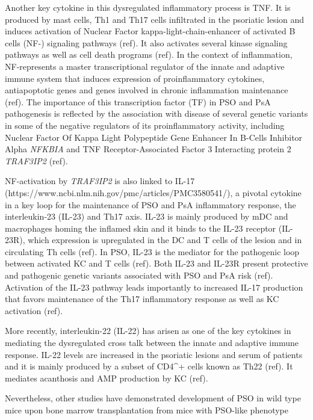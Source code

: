 Another key cytokine in this dysregulated inflammatory process is TNF\alpha. It is produced by mast cells, Th1 and Th17 cells infiltrated in the psoriatic lesion and induces activation of Nuclear Factor kappa-light-chain-enhancer of activated B cells (NF-\kapaB) signaling pathways (ref). It also activates several kinase signaling pathways as well as cell death programs (ref). In the context of inflammation, NF-\kappaB represents a master transcriptional regulator of the innate and adaptive immune system that induces expression of proinflammatory cytokines, antiapoptotic genes and genes involved in chronic inflammation maintenance (ref). The importance of this transcription factor (TF) in PSO and PsA pathogenesis is reflected by the association with disease of several genetic variants in some of the negative regulators of its proinflammatory activity, including Nuclear Factor Of Kappa Light Polypeptide Gene Enhancer In B-Cells Inhibitor Alpha \textit{NFKBIA} and TNF Receptor-Associated Factor 3 Interacting protein 2 \textit{TRAF3IP2} (ref).
 
NF-\kappaB activation by \textit{TRAF3IP2} is also linked to IL-17 (https://www.ncbi.nlm.nih.gov/pmc/articles/PMC3580541/), a pivotal cytokine in a key loop for the maintenance of PSO and PsA inflammatory response, the interleukin-23 (IL-23) and Th17 axis. IL-23 is mainly produced by mDC and macrophages homing the inflamed skin and it binds to the IL-23 receptor (IL-23R), which expression is upregulated in the DC and T cells of the lesion and in circulating Th cells (ref). In PSO, IL-23 is the mediator for the pathogenic loop between activated KC and T cells (ref). Both IL-23 and IL-23R present protective and pathogenic genetic variants associated with PSO and PsA risk (ref). Activation of the IL-23 pathway leads importantly to increased IL-17 production that favors maintenance of the Th17 inflammatory response as well as KC activation (ref).

More recently, interleukin-22 (IL-22) has arisen as one of the key cytokines in mediating the dysregulated cross talk between the innate and adaptive immune response. IL-22 levels are increased in the psoriatic lesions and serum of patients and it is mainly produced by a subset of CD4^+ cells known as Th22 (ref). It mediates acanthosis and AMP production by KC (ref).


   




Nevertheless, other studies have demonstrated development of PSO in wild type mice upon bone marrow transplantation from mice with PSO-like phenotype








